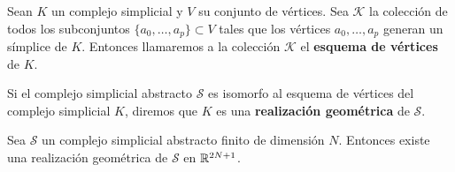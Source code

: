 \begin{definicion}
	Sean $K$ un complejo simplicial y $V$ su conjunto de vértices. Sea
	$\mathcal{K}$ la colección de todos los subconjuntos
	$\{a_{0}, \ldots, a_{p}\} \subset V$ tales que los vértices
	$a_{0}, \ldots, a_{p}$ generan un símplice de $K$. Entonces llamaremos a la colección
	$\mathcal{K}$ el \textbf{esquema de vértices} de $K$.
\end{definicion}
\begin{definicion}
	Si el complejo simplicial abstracto $\mathcal{S}$ es isomorfo al esquema de vértices
	del complejo simplicial $K$, diremos que $K$ es una \textbf{realización
		geométrica} de $\mathcal{S}$.
\end{definicion}
\begin{proposicion}
	Sea $\mathcal{S}$ un complejo simplicial abstracto finito de dimensión $N$.
	Entonces existe una realización geométrica de $\mathcal{S}$ en $\mathbb{R}^{2N+1}$.
\end{proposicion}
